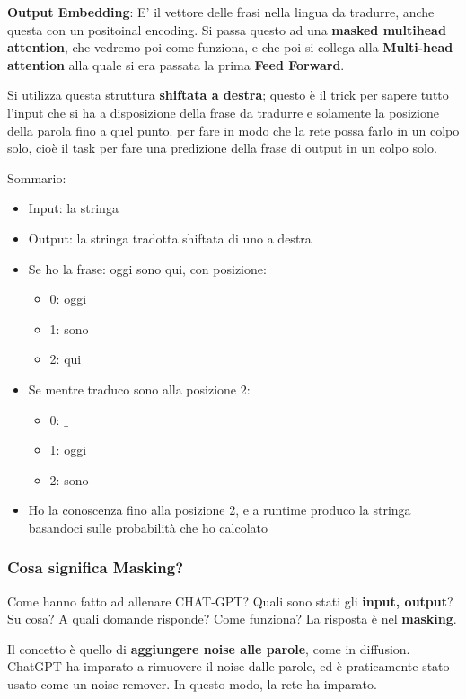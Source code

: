 \textbf{Output Embedding}: E' il vettore delle frasi nella lingua da tradurre, anche questa con un positoinal encoding. Si passa questo ad una \textbf{masked multihead attention}, che vedremo poi come funziona, e che poi si collega alla \textbf{Multi-head attention} alla quale 
si era passata la prima \textbf{Feed Forward}.

Si utilizza questa struttura \textbf{shiftata a destra}; questo è il trick per sapere tutto l'input che si ha a disposizione della frase da tradurre e solamente la posizione della parola fino a quel punto.
per fare in modo che la rete possa farlo in un colpo solo, cioè il task per fare una predizione della frase di output in un colpo solo. 


Sommario: 
\begin{itemize}
    \item Input: la stringa
    \item Output: la stringa tradotta shiftata di uno a destra
    \item Se ho la frase: oggi sono qui, con posizione: 
    \begin{itemize}
        \item 0: oggi
        \item 1: sono
        \item 2: qui
    \end{itemize}
    \item Se mentre traduco sono alla posizione 2:
    \begin{itemize}
        \item 0: $\_$
        \item 1: oggi
        \item 2: sono
    \end{itemize}
    \item Ho la conoscenza fino alla posizione 2, e a runtime produco la stringa basandoci sulle probabilità che ho calcolato
\end{itemize}
\newpage

\subsubsection{Cosa significa Masking?}

Come hanno fatto ad allenare CHAT-GPT? Quali sono stati gli \textbf{input, output}? Su cosa? A quali domande risponde? Come funziona? La risposta è nel \textbf{masking}.

Il concetto è quello di \textbf{aggiungere noise alle parole}, come in diffusion. ChatGPT ha imparato a rimuovere 
il noise dalle parole, ed è praticamente stato usato come un noise remover. In questo modo, la rete ha imparato.